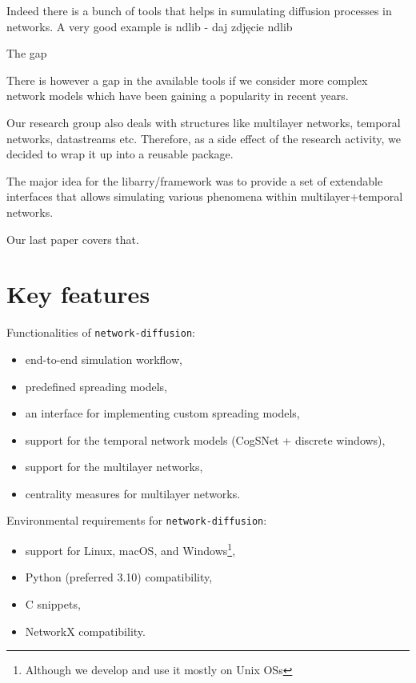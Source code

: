 \documentclass{beamer}
\begin{document}
\begin{frame}{\secname}
    Indeed there is a bunch of tools that helps in sumulating diffusion processes in networks. A very
    good example is ndlib
    - daj zdjęcie ndlib
\end{frame}

\begin{frame}{\secname}
    The gap

    There is however a gap in the available tools if we consider more complex network models which
    have been gaining a popularity in recent years.
\end{frame}

\begin{frame}{\secname}
    Our research group also deals with structures like multilayer networks, temporal networks, datastreams etc.
    Therefore, as a side effect of the research activity, we decided to wrap it up into a reusable 
    package.

    The major idea for the libarry/framework was to provide a set of extendable interfaces that allows simulating
    various phenomena within multilayer+temporal networks.

    Our last paper covers that.
\end{frame}

\section{Key features}

\begin{frame}{\secname}
    Functionalities of \lstinline[style=py]{network-diffusion}:
    \begin{itemize}
        \item end-to-end simulation workflow,
        \item predefined spreading models,
        \item an interface for implementing custom spreading models,
        \item support for the temporal network models (CogSNet + discrete windows),
        \item support for the multilayer networks,
        \item centrality measures for multilayer networks.
    \end{itemize}
\end{frame}

\begin{frame}{\secname}
    Environmental requirements for \lstinline[style=py]{network-diffusion}:
    \begin{itemize}
        \item support for Linux, macOS, and Windows\footnote{Although we develop and use it mostly on Unix OSs},
        \item Python (preferred 3.10) compatibility,
        \item C snippets,
        \item NetworkX compatibility.
    \end{itemize}
\end{frame}
\end{document}
